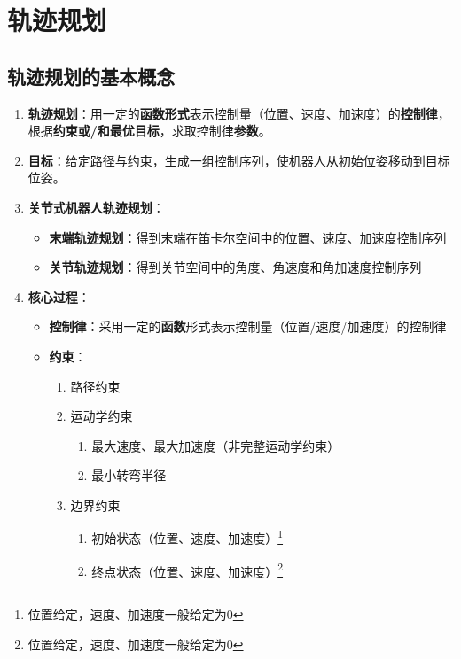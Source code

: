 \documentclass[../main.tex]{subfiles}
\begin{document}
\section{轨迹规划}

\subsection{轨迹规划的基本概念}
\begin{enumerate}
    \item \textbf{轨迹规划}：用一定的\textbf{函数形式}表示控制量（位置、速度、加速度）的\textbf{控制律}，根据\textbf{约束或/和最优目标}，求取控制律\textbf{参数}。
    \item \textbf{目标}：给定路径与约束，生成一组控制序列，使机器人从初始位姿移动到目标位姿。
    \item \textbf{关节式机器人轨迹规划}：
        \begin{itemize}
            \item \textbf{末端轨迹规划}：得到末端在笛卡尔空间中的位置、速度、加速度控制序列
            \item \textbf{关节轨迹规划}：得到关节空间中的角度、角速度和角加速度控制序列
        \end{itemize}
    \item \textbf{核心过程}：
        \begin{itemize}
            \item \textbf{控制律}：采用一定的\textbf{函数}形式表示控制量（位置/速度/加速度）的控制律
            \item \textbf{约束}：
                \begin{enumerate}
                    \item 路径约束
                    \item 运动学约束
                        \begin{enumerate}
                            \item 最大速度、最大加速度（非完整运动学约束）
                            \item 最小转弯半径
                        \end{enumerate}
                    \item 边界约束
                        \begin{enumerate}
                            \item 初始状态（位置、速度、加速度）\footnote{位置给定，速度、加速度一般给定为0}
                            \item 终点状态（位置、速度、加速度）\footnote{位置给定，速度、加速度一般给定为0}

\end{enumerate}
\end{enumerate}
\end{itemize}
\end{enumerate}
\end{document}
